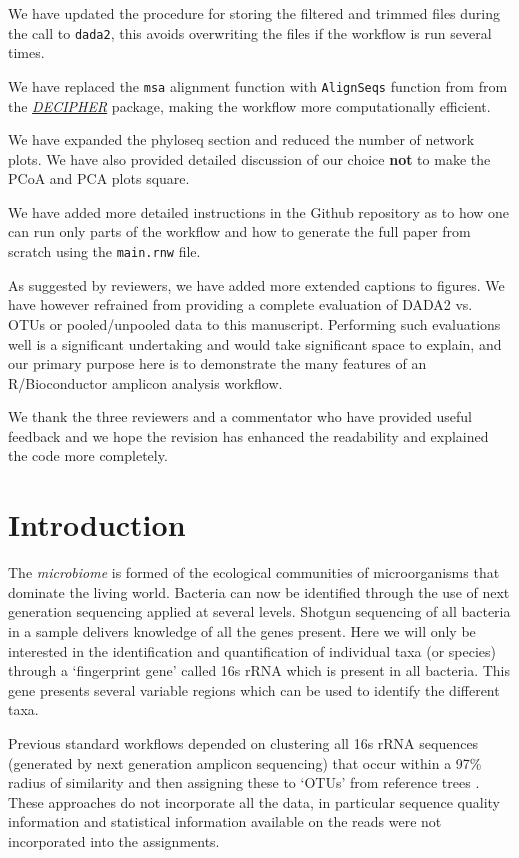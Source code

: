 \documentclass[9pt,a4paper]{extarticle}\usepackage[]{graphicx}\usepackage[]{color}
\newcommand{\pkgname}[1]{\textit{#1}\xspace}
\newcommand{\BioCpkg}[1]{\href{http://www.bioconductor.org/packages/release/bioc/html/#1.html}{\pkgname{#1}}}
\begin{document}
We have updated the procedure for storing the
filtered and trimmed files during the call to 
{\tt dada2}, this avoids overwriting
the files if the workflow is run several times.

We have replaced the {\tt msa} alignment function with {\tt AlignSeqs} function from
from the \BioCpkg{DECIPHER}\citep{DECIPHER} package, making the workflow more computationally efficient.

We have expanded the phyloseq section and reduced the number of network plots.
We have also
provided detailed discussion of our choice {\bf not} to make the PCoA and PCA plots square.

We have added more detailed instructions in the Github repository as to how one can run only parts
of the workflow and how to generate the full paper from scratch using the {\tt main.rnw} file.

As suggested by reviewers, we have added more extended captions to figures. We have however refrained from
providing a complete
evaluation of DADA2 vs. OTUs or pooled/unpooled data to this manuscript. Performing such evaluations well is a significant undertaking and would take significant space to explain, and our primary purpose here is to demonstrate the many features of an R/Bioconductor amplicon analysis workflow.

We thank the three reviewers and a commentator who have provided useful feedback and we hope the revision has enhanced the readability and explained  the code more completely.

\section*{Introduction}
The {\em microbiome} is formed of the ecological communities of
microorganisms that dominate the living world. Bacteria can now be
identified through the use of next generation sequencing applied at
several levels.  Shotgun sequencing of all bacteria in a sample
delivers knowledge of all the genes present. Here we will only be
interested in the identification and quantification of individual taxa
(or species) through a `fingerprint gene' called 16s rRNA which is
present in all bacteria. This gene presents several variable regions
which can be used to identify the different taxa.

Previous standard workflows depended on clustering all 16s rRNA
sequences (generated by next generation amplicon sequencing)
that occur within a 97\% radius of similarity and then
assigning these to `OTUs' from reference trees
\cite{caporaso2010qiime,mothur}. These approaches do not
incorporate all the data, in particular sequence quality information and statistical information
available on the reads were not incorporated into the assignments.
\end{document}
